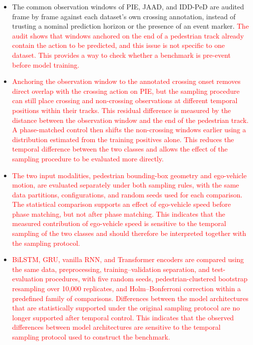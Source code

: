 \documentclass[mti,article,submit,moreauthors]{Definitions/mdpi}
\begin{document}
\begin{itemize}
\item The common observation windows of PIE, JAAD, and IDD-PeD are audited frame by frame against each dataset's own crossing annotation, instead of trusting a nominal prediction horizon or the presence of an event marker. \textcolor{red}{The audit shows that windows anchored on the end of a pedestrian track already contain the action to be predicted, and this issue is not specific to one dataset. This provides a way to check whether a benchmark is pre-event before model training.}

\item \textcolor{red}{Anchoring the observation window to the annotated crossing onset removes direct overlap with the crossing action on PIE, but the sampling procedure can still place crossing and non-crossing observations at different temporal positions within their tracks. This residual difference is measured by the distance between the observation window and the end of the pedestrian track. A phase-matched control then shifts the non-crossing windows earlier using a distribution estimated from the training positives alone. This reduces the temporal difference between the two classes and allows the effect of the sampling procedure to be evaluated more directly.
}

\item \textcolor{red}{The two input modalities, pedestrian bounding-box geometry and ego-vehicle motion, are evaluated separately under both sampling rules, with the same data partitions, configurations, and random seeds used for each comparison. The statistical comparison supports an effect of ego-vehicle speed before phase matching, but not after phase matching. This indicates that the measured contribution of ego-vehicle speed is sensitive to the temporal sampling of the two classes and should therefore be interpreted together with the sampling protocol.}

\item \textcolor{red}{BiLSTM, GRU, vanilla RNN, and Transformer encoders are compared using the same data, preprocessing, training–validation separation, and test-evaluation procedures, with five random seeds, pedestrian-clustered bootstrap resampling over 10,000 replicates, and Holm–Bonferroni correction within a predefined family of comparisons. Differences between the model architectures that are statistically supported under the original sampling protocol are no longer supported after temporal control. This indicates that the observed differences between model architectures are sensitive to the temporal sampling protocol used to construct the benchmark.}
\end{itemize}
\end{document}
